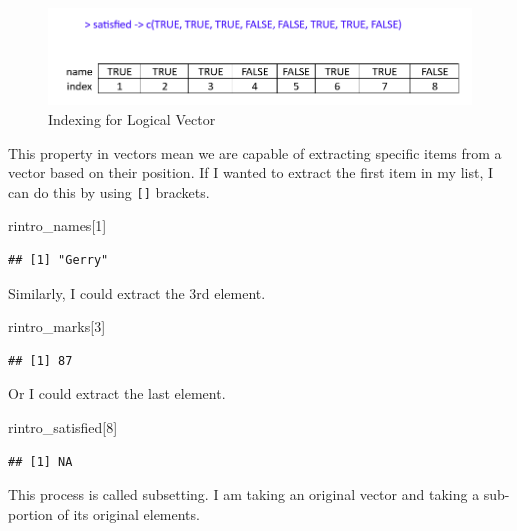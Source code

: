 \documentclass[
]{book}
\newenvironment{Shaded}{\begin{snugshade}}{\end{snugshade}}
\newcommand{\DecValTok}[1]{\textcolor[rgb]{0.00,0.00,0.81}{#1}}
\newcommand{\NormalTok}[1]{#1}
\begin{document}
\begin{figure}
\centering
\includegraphics{img/03-index-logical.png}
\caption{\label{fig:unnamed-chunk-51}Indexing for Logical Vector}
\end{figure}

This property in vectors mean we are capable of extracting specific items from a vector based on their position. If I wanted to extract the first item in my list, I can do this by using \texttt{{[}{]}} brackets.

\begin{Shaded}
\begin{Highlighting}[]
\NormalTok{rintro\_names[}\DecValTok{1}\NormalTok{]}
\end{Highlighting}
\end{Shaded}

\begin{verbatim}
## [1] "Gerry"
\end{verbatim}

Similarly, I could extract the 3rd element.

\begin{Shaded}
\begin{Highlighting}[]
\NormalTok{rintro\_marks[}\DecValTok{3}\NormalTok{]}
\end{Highlighting}
\end{Shaded}

\begin{verbatim}
## [1] 87
\end{verbatim}

Or I could extract the last element.

\begin{Shaded}
\begin{Highlighting}[]
\NormalTok{rintro\_satisfied[}\DecValTok{8}\NormalTok{]}
\end{Highlighting}
\end{Shaded}

\begin{verbatim}
## [1] NA
\end{verbatim}

This process is called subsetting. I am taking an original vector and taking a sub-portion of its original elements.
\end{document}
